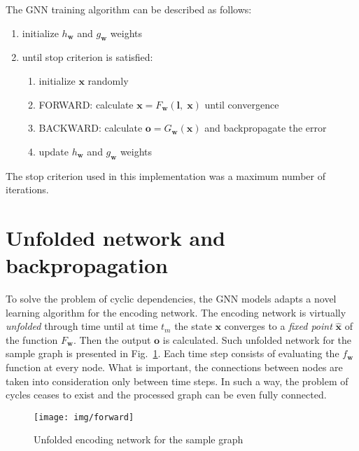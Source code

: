 \noindent The GNN training algorithm can be described as follows:
\begin{enumerate}
	\item initialize $h_{\bm{w}}$ and $g_{\bm{w}}$ weights
	\item until stop criterion is satisfied:
	\begin{enumerate}
		\item initialize $\bm{x}$ randomly
		\item FORWARD: calculate $\bm{x} = F_{\bm{w}}(\bm{l}, \; \bm{x})$ until convergence
		\item BACKWARD: calculate $\bm{o} = G_{\bm{w}}(\bm{x})$ and backpropagate the error
		\item update $h_{\bm{w}}$ and $g_{\bm{w}}$ weights
	\end{enumerate}
\end{enumerate}
\noindent The stop criterion used in this implementation was a maximum number of iterations.


\section{Unfolded network and backpropagation}
To solve the problem of cyclic dependencies, the GNN models adapts a novel learning algorithm for the encoding network. The encoding network is virtually \emph{unfolded} through time until at time $t_m$ the state $\bm{x}$ converges to a \emph{fixed point} $\hat{\bm{x}}$ of the function  $F_{\bm{w}}$. Then the output $\bm{o}$ is calculated. Such unfolded network for the sample graph is presented in Fig.~\ref{fig:gnn_forward}. Each time step consists of evaluating the $f_{\bm{w}}$ function at every node. What is important, the connections between nodes are taken into consideration only between time steps. In such a way, the problem of cycles ceases to exist and the processed graph can be even fully connected.

\begin{figure}[h!]
\begin{center}
	\texttt{[image: img/forward]}
	\caption{Unfolded encoding network for the sample graph}
	\label{fig:gnn_forward}
\end{center}
\end{figure}

